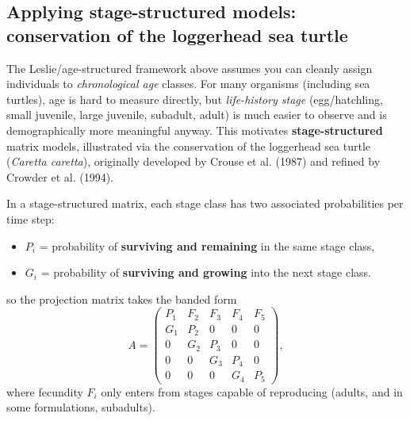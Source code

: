\documentclass[11pt,a4paper]{article}
\begin{document}
\subsection{Applying stage-structured models: conservation of the loggerhead sea turtle}
\label{sec:turtle-case-study}
The Leslie/age-structured framework above assumes you can cleanly assign individuals to \emph{chronological age} classes. For many organisms (including sea turtles), age is hard to measure directly, but \emph{life-history stage} (egg/hatchling, small juvenile, large juvenile, subadult, adult) is much easier to observe and is demographically more meaningful anyway. This motivates \textbf{stage-structured} matrix models, illustrated via the conservation of the loggerhead sea turtle (\emph{Caretta caretta}), originally developed by Crouse et al. (1987) and refined by Crowder et al. (1994).

In a stage-structured matrix, each stage class has two associated probabilities per time step:
\begin{itemize}[leftmargin=1.5em]
\item $P_i$ = probability of \textbf{surviving and remaining} in the same stage class,
\item $G_i$ = probability of \textbf{surviving and growing} into the next stage class.
\end{itemize}
so the projection matrix takes the banded form
\[
A = \begin{pmatrix}
P_1 & F_2 & F_3 & F_4 & F_5 \\
G_1 & P_2 & 0 & 0 & 0 \\
0 & G_2 & P_3 & 0 & 0 \\
0 & 0 & G_3 & P_4 & 0 \\
0 & 0 & 0 & G_4 & P_5
\end{pmatrix},
\]
where fecundity $F_i$ only enters from stages capable of reproducing (adults, and in some formulations, subadults).
\end{document}
